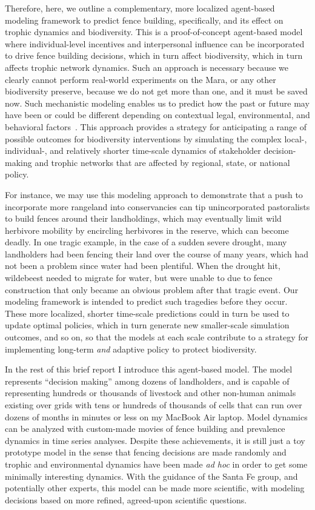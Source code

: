 \documentclass{article}
\begin{document}
Therefore, here, we outline a complementary, more localized agent-based
modeling framework to predict fence building, specifically, and its effect on
trophic dynamics and biodiversity. This is a proof-of-concept agent-based
model where individual-level incentives and interpersonal influence can be
incorporated to drive fence building decisions, which in turn affect
biodiversity, which in turn affects trophic network dynamics. 
Such an approach is necessary because we clearly cannot perform real-world
experiments on the Mara, or any other biodiversity preserve, because we do not
get more than one, and it must be saved now. Such mechanistic modeling enables
us to predict how the past or future may have been or could be different
depending on contextual legal, environmental, and behavioral
factors~\cite{Turner2022}. This approach provides a strategy for anticipating
a range of possible outcomes for biodiversity interventions by simulating the
complex local-, individual-, and relatively shorter time-scale dynamics of
stakeholder decision-making and trophic networks that are affected by
regional, state, or national policy. 

For instance, we may use this modeling approach to
demonstrate that a push to incorporate more rangeland into conservancies can tip
unincorporated pastoralists to build fences around their landholdings, which may
eventually limit wild herbivore mobility by encircling herbivores in the reserve,
which can become deadly. In one tragic example, in the case of a sudden severe
drought, many landholders had been fencing their land over the course of many
years, which had not been a problem since water had been plentiful. When the
drought hit, wildebeest needed to migrate for water, but were unable to due to
fence construction that only became an obvious problem after that tragic event.
Our modeling framework is intended to predict such tragedies before they occur. 
These more localized, shorter time-scale predictions could in turn be used to
update optimal policies, which in turn generate new smaller-scale simulation
outcomes, and so on, so that the models at each scale contribute to a strategy
for implementing long-term \emph{and} adaptive policy to protect biodiversity.

In the rest of this brief report I introduce this agent-based model. The
model represents ``decision making'' among dozens of landholders, and is
capable of representing hundreds or thousands of livestock and other non-human
animals existing over grids with tens or hundreds of thousands of cells that
can run over dozens of months in minutes or less on my MacBook Air laptop.
Model dynamics can be analyzed with custom-made movies of fence building and
prevalence dynamics in time series analyses. Despite these achievements, it
is still just a toy prototype model in the sense that fencing decisions are
made randomly and trophic and environmental dynamics have been made \emph{ad
hoc} in order to get some minimally interesting dynamics. With the guidance of
the Santa Fe group, and potentially other experts, this model can be made more
scientific, with modeling decisions based on more refined, agreed-upon
scientific questions.
\end{document}

